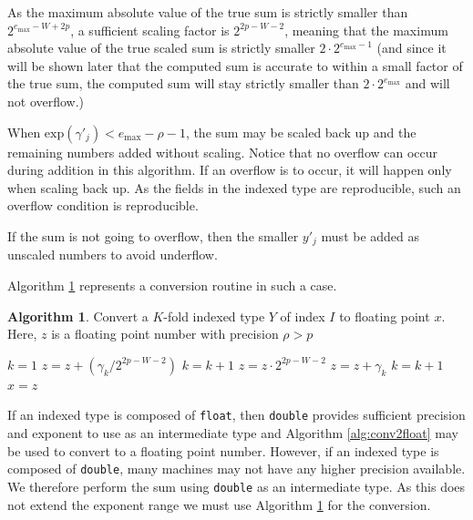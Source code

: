 \documentclass[12pt]{article}
\providecommand{\exp}{\ensuremath{\text{exp}}}
\providecommand{\max}{\ensuremath{\text{max}}}
\theoremstyle{definition}
\newtheorem{alg}{Algorithm}[section]
\numberwithin{equation}{section}
\numberwithin{figure}{section}
\begin{document}
    As the maximum absolute value of the true sum is strictly smaller than $2^{e_{\max} - W + 2  p}$, a sufficient scaling factor is $2^{2  p - W - 2}$, meaning that the maximum absolute value of the true scaled sum is strictly smaller $2 \cdot 2^{e_{\max} - 1}$ (and since it will be shown later that the computed sum is accurate to within a small factor of the true sum, the computed sum will stay strictly smaller than $2 \cdot 2^{e_{\max}}$ and will not overflow.)

  When $\exp(\gamma'_j) < e_{\max} - \rho - 1$, the sum may be scaled back up and the remaining numbers added without scaling. Notice that no overflow can occur during addition in this algorithm. If an overflow is to occur, it will happen only when scaling back up. As the fields in the indexed type are reproducible, such an overflow condition is reproducible.

    If the sum is not going to overflow, then the smaller $y'_j$ must be added as unscaled numbers to avoid underflow.

    Algorithm \ref{alg:conv2floatoverflow} represents a conversion routine in such a case.

    \begin{samepage}
    \begin{alg}
      Convert a $K$-fold indexed type $Y$ of index $I$ to floating point $x$. Here, $z$ is a floating point number with precision $\rho > p$
      \begin{algorithmic}[1]
          \State $k = 1$
          \While{$k \leq 2 K$ and $\exp(\gamma_k) \geq e_{\max} - \rho - 1$}
            \State $z = z + (\gamma_k / 2^{2 p - W - 2})$
            \State $k = k + 1$
          \EndWhile
          \State $z = z \cdot 2^{2 p - W - 2}$
            \State $z = z + \gamma_k$
            \State $k = k + 1$
          \EndWhile
          \State $x = z$
        \EndFunction
      \end{algorithmic}
      \label{alg:conv2floatoverflow}
    \end{alg}
    \end{samepage}

    If an indexed type is composed of \texttt{float}, then \texttt{double} provides sufficient precision and exponent to use as an intermediate type and Algorithm \ref{alg:conv2float} may be used to convert to a floating point number.
    However, if an indexed type is composed of \texttt{double}, many machines may not have any higher precision available. We therefore perform the sum using \texttt{double} as an intermediate type. As this does not extend the exponent range we must use Algorithm \ref{alg:conv2floatoverflow} for the conversion.
\end{document}
